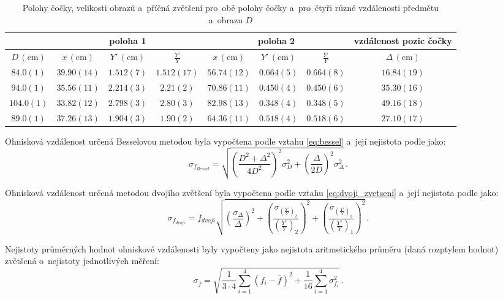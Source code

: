 \documentclass{../concepts/titul_zprava_p/prepareprotokolZprava} %
\newcommand{\relative}[1]{
\frac{\sigma_{#1}}{#1}
}
\newcommand{\squared}[1]{
\left( #1 \right)^2
}
\newcommand{\relsqr}[1]{
\squared{\relative{#1}}
}
\begin{document}
\begin{table}[!htbp]
\centering
\caption{Polohy čočky, velikosti obrazů a~příčná zvětšení pro~obě polohy čočky a~pro~čtyři různé vzdálenosti předmětu a~obrazu $D$}
\begin{tabular}{c|ccc|ccc|c}
 \toprule
 & \multicolumn{3}{c|}{poloha 1} & \multicolumn{3}{c|}{poloha 2} & vzdálenost pozic čočky \\
 \midrule
 $D\, (\mathrm{cm})$ & $x\, (\mathrm{cm})$ & $Y'\, (\mathrm{cm})$ & $\frac{Y'}{{Y}}$ & $x\, (\mathrm{cm})$ & $Y'\, (\mathrm{cm})$ & $\frac{Y'}{{Y}}$ & $\Delta\, (\mathrm{cm})$ \\
 \midrule
 $84.0(1)$ & $39.90(14)$ & $1.512(7)$ & $1.512(17)$ & $56.74(12)$ & $0.664(5)$ & $0.664(8)$ & $16.84(19)$ \\
 $94.0(1)$ & $35.56(11)$ & $2.214(3)$ & $2.21(2)$ & $70.86(11)$ & $0.450(4)$ & $0.450(6)$ & $35.30(16)$ \\
 $104.0(1)$ & $33.82(12)$ & $2.798(3)$ & $2.80(3)$ & $82.98(13)$ & $0.348(4)$ & $0.348(5)$ & $49.16(18)$ \\
 $89.0(1)$ & $37.26(13)$ & $1.904(3)$ & $1.90(2)$ & $64.36(11)$ & $0.518(4)$ & $0.518(6)$ & $27.10(17)$ \\
 \bottomrule
\end{tabular}
\label{tab:prumer_data}
\end{table}

Ohnisková vzdálenost určená Besselovou metodou byla vypočtena podle vztahu \ref{eq:bessel} a~její nejistota podle \cite{englich} jako:
\begin{equation}
    \label{eq:sigma_f_bessel}
    \sigma_{f_{Bessel}} = \sqrt{ \left(\frac{D^2 + \Delta^2}{4 D^2}\right)^2 \sigma_D^2 + 
    \left(\frac{\Delta}{2 D}\right)^2 \sigma_{\Delta}^2 } \,.
\end{equation}

Ohnisková vzdálenost určená metodou dvojího zvětšení byla vypočtena podle vztahu \ref{eq:dvoji_zvetseni} a~její nejistota podle \cite{englich} jako:
\begin{equation}
    \label{eq:sigma_f_dvoji}
    \sigma_{f_{dvoji}} = f_{dvoji} \sqrt{ \relsqr{\Delta} + \relsqr{\left(\frac{Y'}{Y}\right)_2} 
    + \relsqr{\left(\frac{Y'}{Y}\right)_1} } \,.
\end{equation}

Nejistoty průměrných hodnot ohniskové vzdálenosti byly vypočteny jako nejistota aritmetického průměru (daná rozptylem
hodnot) zvětšená o~nejistoty jednotlivých měření:
\begin{equation}
    \label{eq:sigma_mean_f}
    \sigma_{\overline{f}} = \sqrt{ \frac{1}{3 \cdot 4} \sum_{i=1}^{4} \left( f_i - \overline{f} \right)^2
    + \frac{1}{16} \sum_{i=1}^{4} \sigma_{f_i}^2 } \,.
\end{equation}
\end{document}
